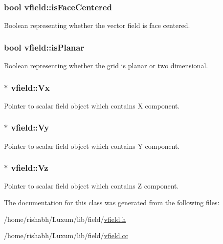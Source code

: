 \subsubsection[{\texorpdfstring{is\+Face\+Centered}{isFaceCentered}}]{\setlength{\rightskip}{0pt plus 5cm}bool vfield\+::is\+Face\+Centered}\hypertarget{classvfield_a140347737e87ffc51d2f576f8abeeb36}{}\label{classvfield_a140347737e87ffc51d2f576f8abeeb36}
Boolean representing whether the vector field is face centered. 
\subsubsection[{\texorpdfstring{is\+Planar}{isPlanar}}]{\setlength{\rightskip}{0pt plus 5cm}bool vfield\+::is\+Planar}\hypertarget{classvfield_a0a84cbcee0423b3b8c1bd0e2f3158e3c}{}\label{classvfield_a0a84cbcee0423b3b8c1bd0e2f3158e3c}
Boolean representing whether the grid is planar or two dimensional. 
\subsubsection[{\texorpdfstring{Vx}{Vx}}]{$\ast$ vfield\+::\+Vx}\hypertarget{classvfield_a71dd043fcada500d160a47dc278d0534}{}\label{classvfield_a71dd043fcada500d160a47dc278d0534}
Pointer to scalar field object which contains X component. 
\subsubsection[{\texorpdfstring{Vy}{Vy}}]{$\ast$ vfield\+::\+Vy}\hypertarget{classvfield_a74783f59f431458ba8fe01c5ff02a529}{}\label{classvfield_a74783f59f431458ba8fe01c5ff02a529}
Pointer to scalar field object which contains Y component. 
\subsubsection[{\texorpdfstring{Vz}{Vz}}]{$\ast$ vfield\+::\+Vz}\hypertarget{classvfield_a796fb8f07f64efdf33673579a930cb66}{}\label{classvfield_a796fb8f07f64efdf33673579a930cb66}
Pointer to scalar field object which contains Z component. 

The documentation for this class was generated from the following files\+:\begin{DoxyCompactItemize}
\item 
/home/rishabh/\+Luxum/lib/field/\hyperlink{vfield_8h}{vfield.\+h}\item 
/home/rishabh/\+Luxum/lib/field/\hyperlink{vfield_8cc}{vfield.\+cc}\end{DoxyCompactItemize}
